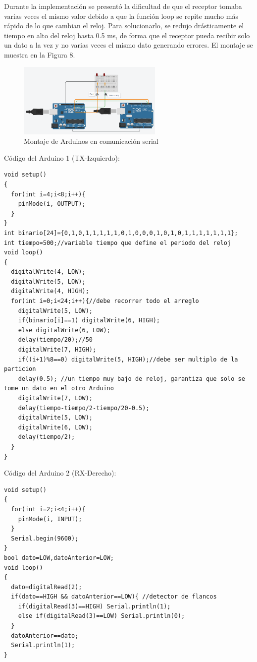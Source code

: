 \documentclass{article}
\begin{document}
Durante la implementación se presentó la dificultad de que el receptor tomaba varias veces el mismo valor debido a que la función loop se repite mucho más rápido de lo que cambian el reloj. Para solucionarlo, se redujo drásticamente el tiempo en alto del reloj hasta 0.5 ms, de forma que el receptor pueda recibir solo un dato a la vez y no varias veces el mismo dato generando errores. El montaje se muestra en la Figura 8.

\begin{figure}[!ht] 
\includegraphics[width=7cm]{montajeSerial.PNG}
\centering
\caption{Montaje de Arduinos en comunicación serial}
\end{figure}

\noindent
Código del Arduino 1 (TX-Izquierdo):

\begin{lstlisting}[style=C++]
void setup()
{
  for(int i=4;i<8;i++){
  	pinMode(i, OUTPUT);
  }  
}
int binario[24]={0,1,0,1,1,1,1,1,0,1,0,0,0,1,0,1,0,1,1,1,1,1,1,1};
int tiempo=500;//variable tiempo que define el periodo del reloj
void loop()
{
  digitalWrite(4, LOW);
  digitalWrite(5, LOW);
  digitalWrite(4, HIGH);
  for(int i=0;i<24;i++){//debe recorrer todo el arreglo
    digitalWrite(5, LOW);
    if(binario[i]==1) digitalWrite(6, HIGH);
    else digitalWrite(6, LOW);
    delay(tiempo/20);//50
    digitalWrite(7, HIGH);
    if((i+1)%8==0) digitalWrite(5, HIGH);//debe ser multiplo de la particion
    delay(0.5); //un tiempo muy bajo de reloj, garantiza que solo se tome un dato en el otro Arduino
    digitalWrite(7, LOW);
    delay(tiempo-tiempo/2-tiempo/20-0.5);
    digitalWrite(5, LOW);
    digitalWrite(6, LOW);
    delay(tiempo/2); 
  }
}
\end{lstlisting}

\noindent
Código del Arduino 2 (RX-Derecho):

\begin{lstlisting}[style=C++]
void setup()
{
  for(int i=2;i<4;i++){
  	pinMode(i, INPUT);
  } 
  Serial.begin(9600);
}
bool dato=LOW,datoAnterior=LOW;
void loop()
{
  dato=digitalRead(2);
  if(dato==HIGH && datoAnterior==LOW){ //detector de flancos
  	if(digitalRead(3)==HIGH) Serial.println(1);
    else if(digitalRead(3)==LOW) Serial.println(0);
  }
  datoAnterior==dato;
  Serial.println(1);
}
\end{lstlisting}
\end{document}
